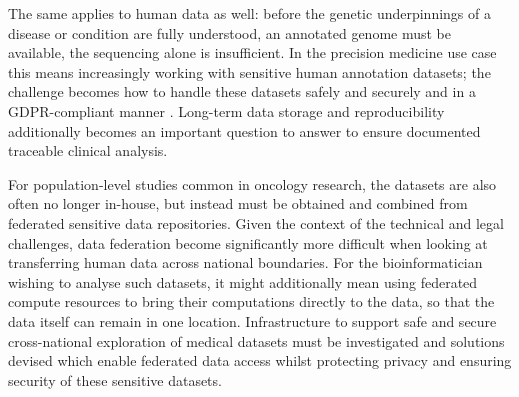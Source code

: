The same applies to human data as well: before the genetic underpinnings of a disease or condition are fully understood, an annotated genome must be available, the sequencing alone is insufficient\cite{Steward_2017}.
In the precision medicine use case this means increasingly working with sensitive human annotation datasets; the challenge becomes how to handle these datasets safely and securely and in a GDPR-compliant manner \cite{Minssen_2020}.
Long-term data storage and reproducibility additionally becomes an important question to answer to ensure documented traceable clinical analysis\cite{Huang_2012}.

For population-level studies common in oncology research, the datasets are also often no longer in-house, but instead must be obtained and combined from federated sensitive data repositories\cite{Rambla_2022}.
Given the context of the technical and legal challenges, data federation become significantly more difficult when looking at transferring human data across national boundaries.
For the bioinformatician wishing to analyse such datasets, it might additionally mean using federated compute resources to bring their computations directly to the data\cite{De_Brouwer_2021}, so that the data itself can remain in one location.
Infrastructure to support safe and secure cross-national exploration of medical datasets must be investigated and solutions devised which enable federated data access whilst protecting privacy and ensuring security of these sensitive datasets.


